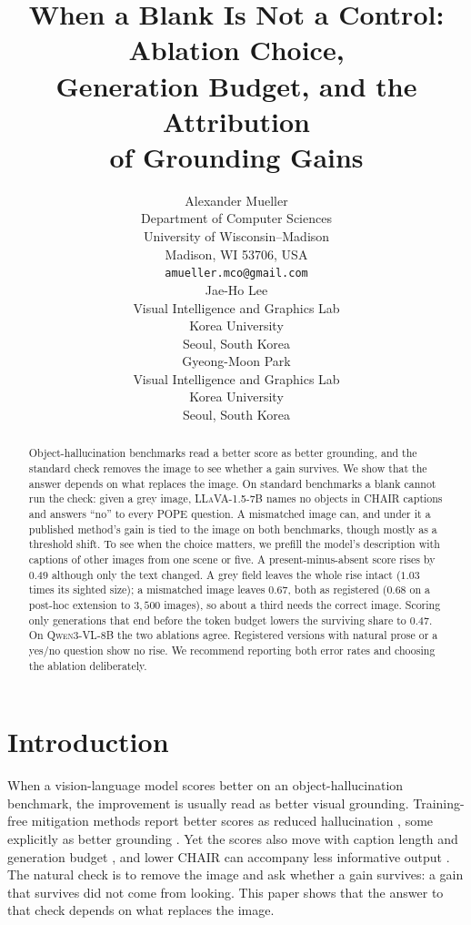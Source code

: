 \documentclass{article} %
\title{When a Blank Is Not a Control: Ablation Choice,\\Generation Budget, and the Attribution\\of Grounding Gains}
\author{Alexander Mueller \\
Department of Computer Sciences\\
University of Wisconsin--Madison\\
Madison, WI 53706, USA \\
\texttt{amueller.mco@gmail.com} \\
\And
Jae-Ho Lee \\
Visual Intelligence and Graphics Lab \\
Korea University \\
Seoul, South Korea \\
\And
Gyeong-Moon Park \\
Visual Intelligence and Graphics Lab \\
Korea University \\
Seoul, South Korea
}
\begin{document}
\maketitle

\begin{abstract}
Object-hallucination benchmarks read a better score as better grounding, and the standard check
removes the image to see whether a gain survives. We show that the answer depends on what replaces
the image. On standard benchmarks a blank cannot run the check: given a grey image,
\textsc{LLaVA-1.5-7B} names no objects in CHAIR captions and answers ``no'' to every POPE question. A
mismatched image can, and under it a published method's gain is tied to the image on both benchmarks,
though mostly as a threshold shift. To see when the choice matters, we prefill the model's description
with captions of other images from one scene or five. A present-minus-absent score rises by $0.49$
although only the text changed. A grey field leaves the whole rise intact ($1.03$ times its sighted
size); a mismatched image leaves $0.67$, both as registered ($0.68$ on a post-hoc extension to
$3{,}500$ images), so about a third needs the correct image. Scoring only generations that
end before the token budget lowers the surviving share to $0.47$. On \textsc{Qwen3-VL-8B} the two
ablations agree. Registered versions with natural prose or a yes/no question show no rise. We recommend
reporting both error rates and choosing the ablation deliberately.
\end{abstract}

\section{Introduction}

When a vision-language model scores better on an object-hallucination benchmark, the improvement is
usually read as better visual grounding. Training-free mitigation methods report better scores as
reduced hallucination \citep{pai, vista, adaiat, regionaware, vcd}, some explicitly as better
grounding \citep{cai, savaa}. Yet the scores also move with caption length and generation budget
\citep{pope, regionaware}, and lower CHAIR can accompany less informative output \citep{safefaith}.
The natural check is to remove the image and ask whether a gain survives: a gain that survives did not
come from looking. This paper shows that the answer to that check depends on what replaces the image.
\end{document}
